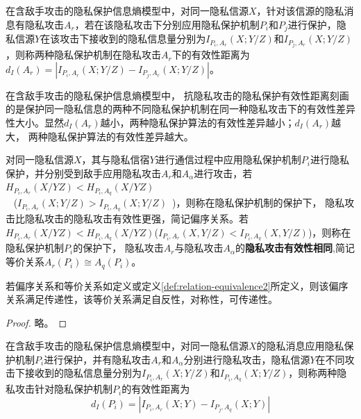 \begin{definition}[抗隐私攻击的隐私保护有效性距离]
	\label{def:privacy-preserving-performance-distance}
	在含敌手攻击的隐私保护信息熵模型中，对同一隐私信源$X$，针对该信源的隐私消息有隐私攻击$A_{r}$，若在该隐私攻击下分别应用隐私保护机制$P_{i}$和$P_{j}$进行保护，隐私信源$Y$在该攻击下接收到的隐私信息量分别为$I_{P_{i},A_{r}}(X;Y/Z)$和$I_{P_{j},A_{r}}(X;Y/Z)$，则称两种隐私保护机制在隐私攻击$A_{r}$下的有效性距离为$d_{I}(A_{r})=\left | I_{P_{i},A_{r}}(X;Y/Z)-I_{P_{j},A_{r}}(X;Y/Z) \right |$。
\end{definition}

在含敌手攻击的隐私保护信息熵模型中， 抗隐私攻击的隐私保护有效性距离刻画的是保护同一隐私信息的两种不同隐私保护机制在同一种隐私攻击下的有效性差异性大小。显然$d_{I}(A_{r})$越小，两种隐私保护算法的有效性差异越小；$d_{I}(A_{r})$越大， 两种隐私保护算法的有效性差异越大。

\begin{definition}
	\label{def:relation-equivalence2}
	 对同一隐私信源$X$，其与隐私信宿$Y$进行通信过程中应用隐私保护机制$P_{i}$进行隐私保护，并分别受到敌手应用隐私攻击$A_{r}$和$A_{\alpha }$进行攻击，若~${{H}_{{{P}_{i}},{{A}_{r}}}}(X/YZ)<{{H}_{{{P}_{i}},{{A}_{q}}}}(X/YZ)$\\~ (${{I}_{{{P}_{i}},{{A}_{r}}}}(X;Y/Z)>{{I}_{{{P}_{i}},{{A}_{q}}}}(X;Y/Z)$~)，则称在隐私保护机制的保护下， 隐私攻击比隐私攻击的隐私攻击有效性更强，简记偏序关系。若$H_{P_{i},A_{r}}(X/YZ)<H_{P_{i},A_{q}}(X/YZ)$($I_{P_{i},A_{r}}(X,Y/Z)<I_{P_{i},A_{q}}(X,Y/Z)$)，则称在隐私保护机制$P_{i}$的保护下， 隐私攻击$A_{r}$与隐私攻击$A_{\alpha }$的\textbf{隐私攻击有效性相同},简记等价关系$A_{r}(P_{i})\cong A_{q}(P_{i})$。
\end{definition}

\begin{theorem}
	\label{thm:relation-equivalence}
	若偏序关系和等价关系如定义\label{def:relation-equivalence}或定义\ref{def:relation-equivalence2}所定义，则该偏序关系满足传递性，该等价关系满足自反性，对称性，可传递性。 
\end{theorem}

\begin{proof}
 略。
\end{proof}


\begin{definition}[隐私攻击有效性距离]
	\label{def:privacy-attack-distance}
	在含敌手攻击的隐私保护信息熵模型中，对同一隐私信源$X$的隐私消息应用隐私保护机制$P_{i}$进行保护，并有隐私攻击$A_{r}$和$A_{\alpha}$分别进行隐私攻击，隐私信源$Y$在不同攻击下接收到的隐私信息量分别为$I_{P_{i},A_{r}}(X;Y/Z)$和$I_{P_{i},A_{q}}(X;Y/Z)$，则称两种隐私攻击针对隐私保护机制$P_{i}$的有效性距离为
\begin{equation}
d_{I}(P_{i})=\left | I_{P_{i},A_{r}}(X;Y)-I_{P_{j},A_{q}}(X;Y) \right |
\end{equation}
\end{definition}

